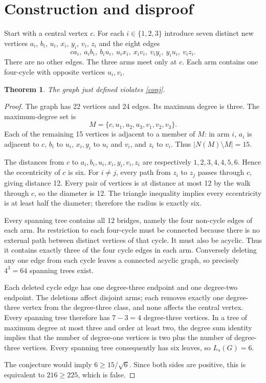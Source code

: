 \documentclass[11pt,a4paper]{article}
\newtheorem{theorem}{Theorem}
\begin{document}
\section{Construction and disproof}
Start with a central vertex $c$. For each $i\in\{1,2,3\}$ introduce seven distinct new vertices
$a_i$, $b_i$, $u_i$, $x_i$, $y_i$, $v_i$, $z_i$ and the eight edges
\[
 ca_i,\ a_ib_i,\ b_iu_i,\ u_ix_i,\ x_iv_i,\ v_iy_i,\ y_iu_i,\ v_iz_i.
\]
There are no other edges. The three arms meet only at $c$. Each arm contains one four-cycle with opposite vertices $u_i,v_i$.
\begin{theorem}
The graph just defined violates \eqref{conj}.
\end{theorem}
\begin{proof}
The graph has 22 vertices and 24 edges. Its maximum degree is three. The maximum-degree set is
\[M=\{c,u_1,u_2,u_3,v_1,v_2,v_3\}.\] Each of the remaining 15 vertices is adjacent to a member of $M$: in arm $i$, $a_i$ is adjacent to $c$, $b_i$ to $u_i$, $x_i,y_i$ to $u_i$ and $v_i$, and $z_i$ to $v_i$. Thus $|N(M)\setminus M|=15$.

The distances from $c$ to $a_i,b_i,u_i,x_i,y_i,v_i,z_i$ are respectively $1,2,3,4,4,5,6$. Hence the eccentricity of $c$ is six. For $i\ne j$, every path from $z_i$ to $z_j$ passes through $c$, giving distance 12. Every pair of vertices is at distance at most 12 by the walk through $c$, so the diameter is 12. The triangle inequality implies every eccentricity is at least half the diameter; therefore the radius is exactly six.

Every spanning tree contains all 12 bridges, namely the four non-cycle edges of each arm. Its restriction to each four-cycle must be connected because there is no external path between distinct vertices of that cycle. It must also be acyclic. Thus it contains exactly three of the four cycle edges in each arm. Conversely deleting any one edge from each cycle leaves a connected acyclic graph, so precisely $4^3=64$ spanning trees exist.

Each deleted cycle edge has one degree-three endpoint and one degree-two endpoint. The deletions affect disjoint arms; each removes exactly one degree-three vertex from the degree-three class, and none affects the central vertex. Every spanning tree therefore has $7-3=4$ degree-three vertices. In a tree of maximum degree at most three and order at least two, the degree sum identity implies that the number of degree-one vertices is two plus the number of degree-three vertices. Every spanning tree consequently has six leaves, so $L_s(G)=6$.

The conjecture would imply $6\ge15/\sqrt6$. Since both sides are positive, this is equivalent to $216\ge225$, which is false.
\end{proof}
\end{document}
